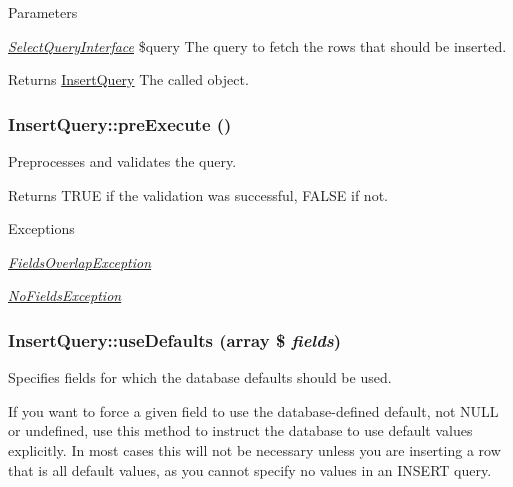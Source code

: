 \begin{DoxyParams}{Parameters}
\item[{\em \hyperlink{interfaceSelectQueryInterface}{SelectQueryInterface}}]\$query The query to fetch the rows that should be inserted.\end{DoxyParams}
\begin{DoxyReturn}{Returns}
\hyperlink{classInsertQuery}{InsertQuery} The called object. 
\end{DoxyReturn}
\hypertarget{classInsertQuery_ae33303d3a1d2edf20a7d3f762a627a0a}{
\subsubsection[{preExecute}]{\setlength{\rightskip}{0pt plus 5cm}InsertQuery::preExecute ()}}
\label{classInsertQuery_ae33303d3a1d2edf20a7d3f762a627a0a}
Preprocesses and validates the query.

\begin{DoxyReturn}{Returns}
TRUE if the validation was successful, FALSE if not.
\end{DoxyReturn}

\begin{DoxyExceptions}{Exceptions}
\item[{\em \hyperlink{classFieldsOverlapException}{FieldsOverlapException}}]\item[{\em \hyperlink{classNoFieldsException}{NoFieldsException}}]\end{DoxyExceptions}
\hypertarget{classInsertQuery_a5d584ac1930b6a791e0c5701d556cb65}{
\subsubsection[{useDefaults}]{\setlength{\rightskip}{0pt plus 5cm}InsertQuery::useDefaults (array \$ {\em fields})}}
\label{classInsertQuery_a5d584ac1930b6a791e0c5701d556cb65}
Specifies fields for which the database defaults should be used.

If you want to force a given field to use the database-\/defined default, not NULL or undefined, use this method to instruct the database to use default values explicitly. In most cases this will not be necessary unless you are inserting a row that is all default values, as you cannot specify no values in an INSERT query.

